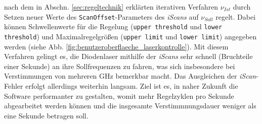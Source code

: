 nach dem in Abschn. \ref{sec:regeltechnik} erklärten iterativen Verfahren
$\nu_{Ist}$ durch Setzen neuer Werte des
\lstinline|ScanOffset|-Parameters des \textit{iScans} auf $\nu_{Soll}$ regelt.
Dabei können Schwellenwerte für die Regelung (\lstinline|upper threshold| und
\lstinline|lower threshold|) und Maximalregelgrößen (\lstinline|upper limit| und
\lstinline|lower limit|) angegeben werden (siehe Abb.
\ref{fig:benutzeroberflaeche_laserkontrolle}). Mit diesem Verfahren gelingt es,
die Diodenlaser mithilfe der \textit{iScans} sehr schnell (Bruchteile einer
Sekunde) an ihre Sollfrequenzen zu fahren, was sich insbesondere bei
Verstimmungen von mehreren GHz bemerkbar macht. Das Ausgleichen der
\textit{iScan}-Fehler erfolgt allerdings weiterhin langsam. Ziel ist es,
in naher Zukunft die Software performanter zu gestalten, womit mehr
Regelzyklen pro Sekunde abgearbeitet werden können und die insgesamte
Verstimmnungsdauer weniger als eine Sekunde betragen soll.

